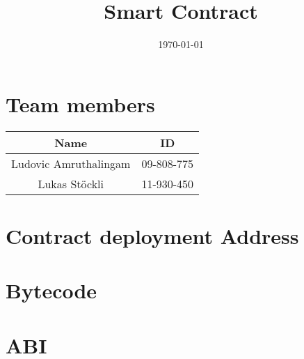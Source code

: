\documentclass[a4]{article}
\begin{document}
\date{\today}
\title{Smart Contract}
\maketitle


\section*{Team members}
\begin{center}
	\begin{tabular}{|c|c|}
		\hline
		 Name & ID \\
		\hline
		 Ludovic Amruthalingam & 09-808-775 \\
		 Lukas Stöckli & 11-930-450 \\
		\hline
	\end{tabular}
\end{center}

\section*{Contract deployment Address}

\section*{Bytecode}

\section*{ABI}
\end{document}
